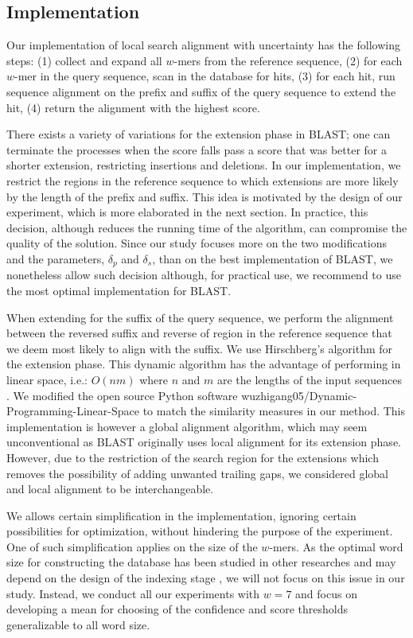 \documentclass{article}
\begin{document}
\subsection{Implementation}

Our implementation of local search alignment with uncertainty has the following steps: (1) collect and expand all $w$-mers from the reference sequence, (2) for each $w$-mer in the query sequence, scan in the database for hits, (3) for each hit, run sequence alignment on the prefix and suffix of the query sequence to extend the hit, (4) return the alignment with the highest score. 

There exists a variety of variations for the extension phase in BLAST; one can terminate the processes when the score falls pass a score that was better for a shorter extension, restricting insertions and deletions. \cite{blast} In our implementation, we restrict the regions in the reference sequence to which extensions are more likely by the length of the prefix and suffix. This idea is motivated by the design of our experiment, which is more elaborated in the next section. In practice, this decision, although reduces the running time of the algorithm, can compromise the quality of the solution. Since our study focuses more on the two modifications and the parameters, $\delta_p$ and $\delta_s$, than on the best implementation of BLAST, we nonetheless allow such decision although, for practical use, we recommend to use the most optimal implementation for BLAST. 

When extending for the suffix of the query sequence, we perform the alignment between the reversed suffix and reverse of region in the reference sequence that we deem most likely to align with the suffix. We use Hirschberg's algorithm for the extension phase. This dynamic algorithm has the advantage of performing in linear space, i.e.: $O(nm)$ where $n$ and $m$ are the lengths of the input sequences \cite{global_align}. We modified the open source Python software wuzhigang05/Dynamic-Programming-Linear-Space to match the similarity measures in our method. This implementation is however a global alignment algorithm, which may seem unconventional as BLAST originally uses local alignment for its extension phase. \cite{blast} However, due to the restriction of the search region for the extensions which removes the possibility of adding unwanted trailing gaps, we considered global and local alignment to be interchangeable.

We allows certain simplification in the implementation, ignoring certain possibilities for optimization, without hindering the purpose of the experiment. One of such simplification applies on the size of the $w$-mers. As the optimal word size for constructing the database has been studied in other researches and may depend on the design of the indexing stage \cite{blast}, we will not focus on this issue in our study. Instead, we conduct all our experiments with $w=7$ and focus on developing a mean for choosing of the confidence and score thresholds generalizable to all word size. 
\end{document}
